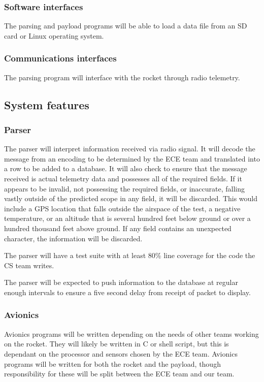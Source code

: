 \documentclass[onecolumn, draftclsnofoot, 10pt, compsoc]{IEEEtran}
\begin{document}
\subsubsection{Software interfaces}
The parsing and payload programs will be able to load a data file from an SD card or Linux operating system.

\subsubsection{Communications interfaces}
The parsing program will interface with the rocket through radio telemetry.

\subsection{System features}

\subsubsection{Parser}
The parser will interpret information received via radio signal. It will decode the message from an encoding to be determined by the ECE team and translated into a row to be added to a database. It will also check to ensure that the message received is actual telemetry data and possesses all of the required fields. If it appears to be invalid, not possessing the required fields, or inaccurate, falling vastly outside of the predicted scope in any field, it will be discarded. This would include a GPS location that falls outside the airspace of the test, a negative temperature, or an altitude that is several hundred feet below ground or over a hundred thousand feet above ground. If any field contains an unexpected character, the information will be discarded.

The parser will have a test suite with at least 80\% line coverage for the code the CS team writes.

The parser will be expected to push information to the database at regular enough intervals to ensure a five second delay from receipt of packet to display.

\subsubsection{Avionics}
Avionics programs will be written depending on the needs of other teams working on the rocket. They will likely be written in C or shell script, but this is dependant on the processor and sensors chosen by the ECE team. Avionics programs will be written for both the rocket and the payload, though responsibility for these will be split between the ECE team and our team.
\end{document}
